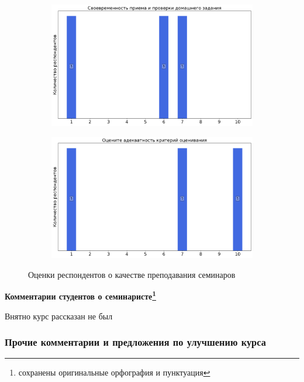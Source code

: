 \begin{figure}[H]
\begin{subfigure}[b]{0.45\textwidth}
                \includegraphics[width=\textwidth]{images/2 course/Компьютерные технологии/seminarists-marks-Чуканова О.В.-2.png}
            \end{subfigure}
            \begin{subfigure}[b]{0.45\textwidth}
                \centering
                \includegraphics[width=\textwidth]{images/2 course/Компьютерные технологии/seminarists-marks-Чуканова О.В.-3.png}
            \end{subfigure}	
            \caption{Оценки респондентов о качестве преподавания семинаров}
        \end{figure}

        \textbf{Комментарии студентов о семинаристе\protect\footnote{сохранены оригинальные орфография и пунктуация}}
            \begin{commentbox} 
                Внятно курс рассказан не был 
            \end{commentbox} 

    
    \subsubsection{Прочие комментарии и предложения по улучшению курса}

